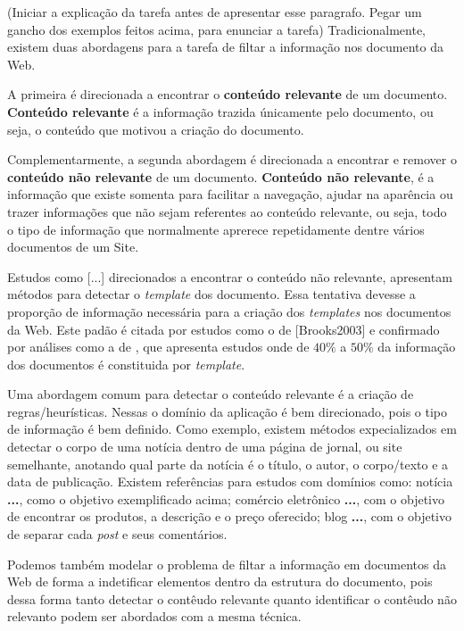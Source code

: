 \documentclass{acm_proc_article-sp}
\newcommand{\remove}[1]{}
\numberwithin{equation}{section}
\begin{document}
\remove{
Retirar uma parcela de informação não relevante desses documentos 
	proporciona benefícios claros.
}

(Iniciar a explicação da tarefa antes de apresentar esse paragrafo.
Pegar um gancho dos exemplos feitos acima, para enunciar a tarefa)
Tradicionalmente, existem duas abordagens para a tarefa de filtar a informação
nos documento da Web. 
  \remove{, diminuindo a quantidade de dados não informativos processados.}
A primeira é direcionada a encontrar o {\bf conteúdo relevante} de um 
	documento. {\bf Conteúdo relevante} é a informação trazida únicamente pelo 
	documento, ou seja,
		o conteúdo que motivou a criação do documento.

Complementarmente, a segunda abordagem é direcionada a encontrar e remover o 
	{\bf conteúdo não relevante} de um documento. {\bf Conteúdo não relevante},
	é a informação que existe somenta para facilitar a navegação,
	ajudar na aparência ou trazer informações que não sejam referentes ao 
	conteúdo relevante, ou seja,
		todo o tipo de informação que normalmente aprerece repetidamente 
		dentre vários documentos de um Site.


Estudos como [...] direcionados a encontrar o conteúdo não relevante,
apresentam métodos para detectar o {\it template} dos documento.
	Essa tentativa devesse a proporção de informação necessária para a criação
	dos {\it templates} nos documentos da Web. Este padão é 
	citada por estudos como o de [Brooks2003] e confirmado por análises 
	como a de \cite{Gibson2005}, que apresenta estudos onde de $40\%$ a $50\%$ da 
  informação dos documentos é constituida por {\it template}.


Uma abordagem comum para detectar o conteúdo relevante é a criação de
regras/heurísticas. 
	Nessas 
		o domínio da aplicação é bem direcionado, pois o tipo de informação é 
		bem definido.
		Como exemplo,
			existem métodos expecializados em detectar o corpo de uma notícia 
			dentro de uma página de jornal, ou site semelhante,
			anotando qual parte da notícia é 
				o título,
				o autor, o corpo/texto e
				a data de publicação.
			Existem referências para estudos com domínios como:
				notícia {\bf \cite{}...}, como o objetivo exemplificado acima;
				comércio eletrônico {\bf \cite{}...}, com o objetivo de 
				encontrar os produtos, a descrição e o preço oferecido;
				blog {\bf \cite{}...}, com o objetivo de separar cada 
				{\it post} e seus comentários.

Podemos também modelar o problema de filtar a informação em documentos da Web
de forma a indetificar elementos dentro da estrutura do documento, pois 
dessa forma tanto detectar o contêudo relevante quanto identificar o contêudo 
não relevanto podem ser abordados com a mesma técnica. 
\end{document}
